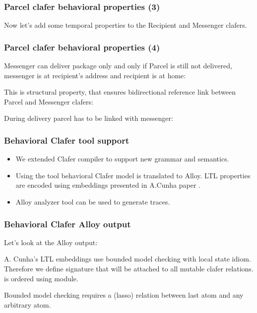 \documentclass[xcolor=dvipsnames,mathserif,12pt,backend=biber]{beamer}
\begin{document}
  \begin{frame}
    \frametitle{Parcel clafer behavioral properties (3)}
    Now let's add some temporal properties to the Recipient and Messenger clafers.
    
  \end{frame}

  \begin{frame}
    \frametitle{Parcel clafer behavioral properties (4)}
    Messenger can deliver package only and only if Parcel is still not delivered, messenger is at recipient's address and recipient is at home:
    
    This is structural property, that ensures bidirectional reference link between Parcel and Messenger clafers:
    
    During delivery parcel has to be linked with messenger:
    
  \end{frame}

  \begin{frame}
    \frametitle{Behavioral Clafer tool support}
    \begin{itemize}
      \item{We extended Clafer compiler to support new grammar and semantics.}
      \item{Using the tool behavioral Clafer model is translated to Alloy. LTL properties are encoded using embeddings presented in A.Cunha paper .}
      \item{Alloy analyzer tool can be used to generate traces.}
      \end{itemize}
  \end{frame}

  \begin{frame}
    \frametitle{Behavioral Clafer Alloy output}
    Let's look at the Alloy output:
    
    
    A. Cunha's LTL embeddings use bounded model checking with local state idiom. Therefore we define  signature that will be attached to all mutable clafer relations.  is ordered using  module.
    
    Bounded model checking requires a  (lasso) relation between last  atom and any arbitrary  atom.
  \end{frame}
\end{document}
